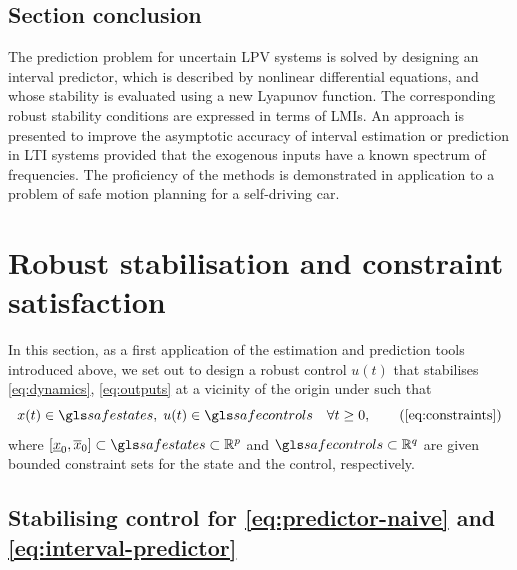 \subsection*{Section conclusion}

The prediction problem for uncertain \gls{LPV} systems is solved by designing an interval predictor, which is described by nonlinear differential equations, and whose stability is evaluated using a new Lyapunov function. The corresponding robust stability conditions are expressed in terms of \glspl{LMI}. An approach is presented to improve the asymptotic accuracy of interval estimation or prediction in \gls{LTI} systems provided that the exogenous inputs have a known spectrum of frequencies. The proficiency of the methods is demonstrated in application to a problem of safe motion planning for a self-driving car.



\section{Robust stabilisation and constraint satisfaction}
\label{sec:robust-stabilisation}

In this section, as a first application of the estimation and prediction tools introduced above, we set out to design a robust control $u(t)$ that stabilises \eqref{eq:dynamics}, \eqref{eq:outputs} at a vicinity of the origin under 
such that
\begin{equation}
x(t)\in\safestates,\;u(t)\in\safecontrols\quad\forall t\geq0,\tag{\ref{eq:constraints}}
\end{equation}
where $[\underline{x}_{0},\overline{x}_{0}]\subset\safestates\subset\Real^{p}$ and $\safecontrols\subset\Real^{q}$ are given bounded constraint sets for the state and the control, respectively.

\subsection{Stabilising control for \eqref{eq:predictor-naive} and \eqref{eq:interval-predictor}}

